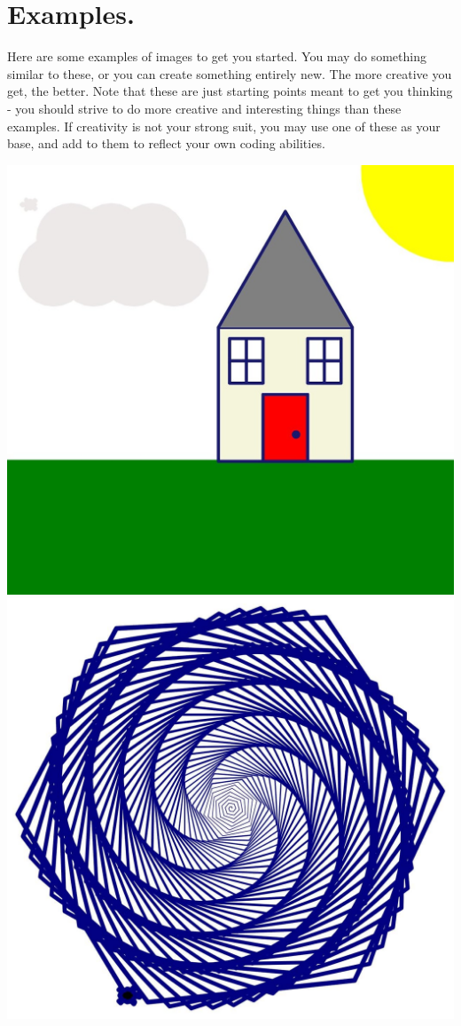 \documentclass[11pt, letterpaper, onecolumn, oneside, final]{article}
\begin{document}
\section{Examples.} Here are some examples of images to get you started. You may do something similar to these, or you can create something entirely new. The more creative you get, the better. Note that these are just starting points meant to get you thinking - you should strive to do more creative and interesting things than these examples. If creativity is not your strong suit, you may use one of these as your base, and add to them to reflect your own coding abilities.\\
\begin{center}

\includegraphics[scale=.2]{house_drawing}\includegraphics[scale=.18]{drawing_example2}


\end{center}
\end{document}
